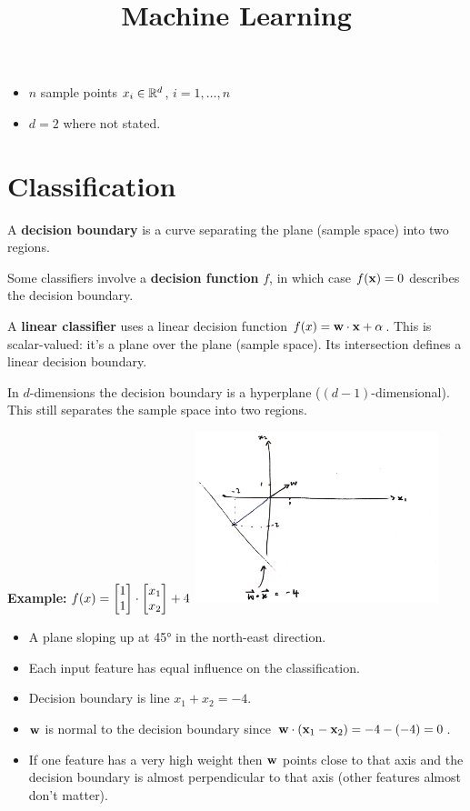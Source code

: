 \documentclass[12pt]{article}
\title{Machine Learning}
\begin{document}
\maketitle

\begin{itemize}
\item $n$ sample points $x_i \in \mathbb{R}^d$, $i = 1, \ldots, n$
\item $d = 2$ where not stated.
\end{itemize}

\section{Classification}

A \textbf{decision boundary} is a curve separating the plane (sample space)
into two regions.

Some classifiers involve a \textbf{decision function} $f$, in which case
$f(\mathbf x) = 0$ describes the decision boundary.

A \textbf{linear classifier} uses a linear decision function
$f(x) = \mathbf w \cdot \mathbf x + \alpha$. This is scalar-valued: it's a plane over
the plane (sample space). Its intersection defines a linear decision boundary.

In $d$-dimensions the decision boundary is a hyperplane
($(d-1)$-dimensional). This still separates the sample space into two regions.

\textbf{Example:} $f(x) = \begin{bmatrix}1\\1\end{bmatrix} \cdot \begin{bmatrix}x_1\\x_2\end{bmatrix} + 4$
\includegraphics[width=200pt]{img/machine-learning-linear-decision-boundary.png}
\begin{itemize}
\item A plane sloping up at 45° in the north-east direction.
\item Each input feature has equal influence on the classification.
\item Decision boundary is line $x_1 + x_2 = -4$.
\item $\mathbf w$ is normal to the decision boundary since $\mathbf w \cdot (\mathbf x_1 - \mathbf x_2) = -4 - (-4) = 0$.
\item If one feature has a very high weight then $\mathbf w$ points close to that
  axis and the decision boundary is almost perpendicular to that axis (other
  features almost don't matter).
\end{itemize}
\end{document}
